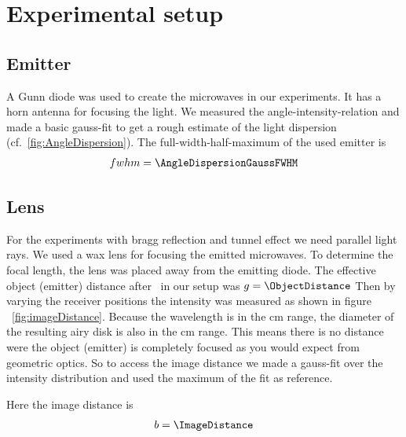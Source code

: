 \documentclass[a4paper,10pt,twocolumn]{article}
\begin{document}
    \section{Experimental setup}
    \subsection{Emitter}
    A Gunn diode was used to create the microwaves in our experiments. 
    It has a horn antenna for focusing the light.
    We measured the angle-intensity-relation and made a basic gauss-fit to get a rough estimate of the light dispersion (cf.~\ref{fig:AngleDispersion}).
    The full-width-half-maximum of the used emitter is
    \begin{align*}
        fwhm = \AngleDispersionGaussFWHM
    \end{align*}



    \subsection{Lens}
    For the experiments with bragg reflection and tunnel effect we need parallel light rays.
    We used a wax lens for focusing the emitted microwaves.
    To determine the focal length, the lens was placed away from the emitting diode.
    The effective object (emitter) distance after~\cite{pasco} in our setup was $g = \ObjectDistance$
    Then by varying the receiver positions the intensity was measured as shown in figure ~\ref{fig:imageDistance}. 
    Because the wavelength is in the cm range, the diameter of the resulting airy disk is also in the cm range.
    This means there is no distance were the object (emitter) is completely focused as you would expect from geometric optics.
    So to access the image distance we made a gauss-fit over the intensity distribution and used the maximum of the fit as
    reference. 
    
    
    Here the image distance is 
    \begin{align*}
        b = \ImageDistance
    \end{align*}
\end{document}
